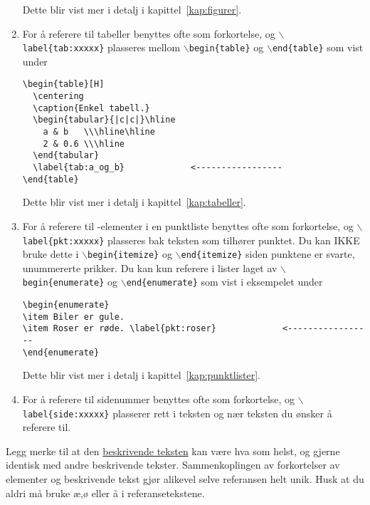 \begin{enumerate}
Dette blir vist mer i detalj i kapittel~\ref{kap:figurer}. 

\item For å referere til {\color{red}tabeller} benyttes ofte  som
  forkortelse, og {\tt $\backslash$label\{tab:xxxxx\}} plasseres
  mellom {\tt $\backslash$begin\{table\}} og 
  {\tt $\backslash$end\{table\}} som vist under

  \begin{boxedminipage}{\textwidth}
\begin{verbatim}
\begin{table}[H]
  \centering
  \caption{Enkel tabell.}
  \begin{tabular}{|c|c|}\hline
    a & b   \\\hline\hline 
    2 & 0.6 \\\hline
  \end{tabular}
  \label{tab:a_og_b}             <-----------------
\end{table}
\end{verbatim}
  \end{boxedminipage}

Dette blir vist mer i detalj i kapittel~\ref{kap:tabeller}.

\item For å referere til {\color{red}-elementer} i en punktliste  benyttes ofte
   som  forkortelse, og {\tt $\backslash$label\{pkt:xxxxx\}}
  plasseres bak teksten som tilhører punktet. 
  Du kan IKKE bruke dette i {\tt $\backslash$begin\{itemize\}} og 
  {\tt $\backslash$end\{itemize\}} siden punktene er svarte, unummererte
  prikker. Du kan kun referere i lister laget av {\tt $\backslash$begin\{enumerate\}} og 
  {\tt $\backslash$end\{enumerate\}} som vist i eksempelet under

  \begin{boxedminipage}{\textwidth}
\begin{verbatim}
\begin{enumerate}
\item Biler er gule.
\item Roser er røde. \label{pkt:roser}             <-----------------
\end{enumerate}
\end{verbatim}
  \end{boxedminipage}

Dette blir vist mer i detalj i kapittel~\ref{kap:punktlister}.

\item For å referere til {\color{red}sidenummer} benyttes ofte
   som  forkortelse, og 
  {\tt  $\backslash$label\{side:xxxxx\}} plasserer
  rett i teksten og nær teksten du ønsker å referere til. \label{pkt:side}
\end{enumerate}
Legg merke til at den \underline{beskrivende teksten} kan være hva som helst, og
gjerne identisk med andre beskrivende tekster. Sammenkoplingen av
forkortelser av elementer og beskrivende tekst gjør alikevel selve
referansen helt unik.
{\color{red}Husk at du aldri må bruke  æ,ø eller å i referansetekstene.}

